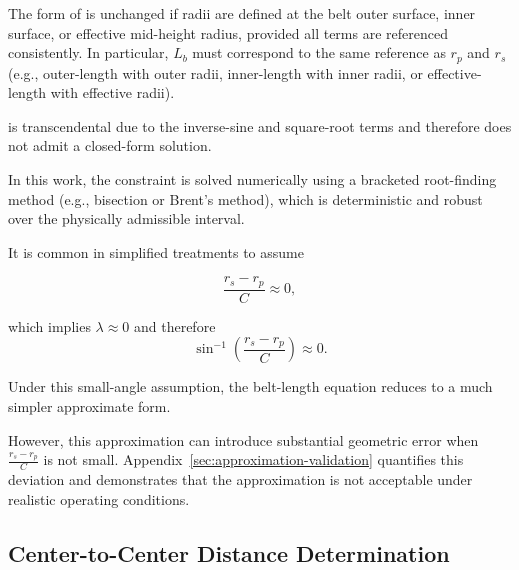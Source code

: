 \documentclass[11pt]{article}
\numberwithin{equation}{section}
\newcounter{assump}
\begin{document}
The form of  is unchanged if radii are defined
at the belt outer surface, inner surface, or effective mid-height radius,
provided all terms are referenced consistently. In particular, $L_b$ must
correspond to the same reference as $r_p$ and $r_s$ (e.g., outer-length with
outer radii, inner-length with inner radii, or effective-length with effective
radii).




\begin{remarkbox}

 is transcendental due to the
inverse-sine and square-root terms and therefore does not admit
a closed-form solution.

In this work, the constraint is solved numerically using a
bracketed root-finding method (e.g., bisection or Brent's method),
which is deterministic and robust over the physically admissible interval.

It is common in simplified treatments to assume

\[
\frac{r_s - r_p}{C} \approx 0,
\]

which implies $\lambda \approx 0$ and therefore
\[
\sin^{-1}\!\left(\frac{r_s - r_p}{C}\right) \approx 0.
\]

Under this small-angle assumption, the belt-length equation reduces to a much
simpler approximate form.

However, this approximation can introduce substantial geometric error when
$\frac{r_s - r_p}{C}$ is not small. Appendix~\ref{sec:approximation-validation}
quantifies this deviation and demonstrates that the approximation
is not acceptable under realistic operating conditions.

\end{remarkbox}





\subsection{Center-to-Center Distance Determination}\label{sec:center_distance}
\end{document}
